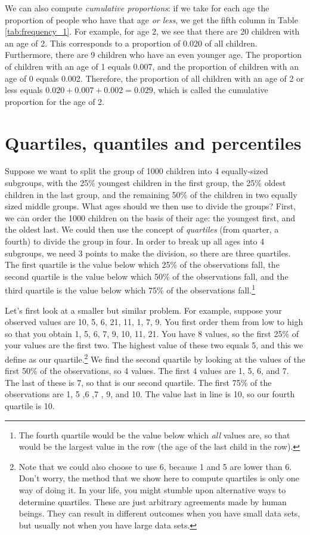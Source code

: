 \documentclass[]{report}\usepackage[]{graphicx}\usepackage[]{color}
\begin{document}
We can also compute \textit{cumulative proportions}: if we take for each age the proportion of people who have that age \textit{or less}, we get the fifth column in Table \ref{tab:frequency_1}. For example, for age 2, we see that there are 20 children with an age of 2. This corresponds to a proportion of 0.020 of all children. Furthermore, there are 9 children who have an even younger age. The proportion of children with an age of 1 equals 0.007, and the proportion of children with an age of 0 equals 0.002. Therefore, the proportion of all children with an age of 2 or less equals $0.020+0.007+0.002=0.029$, which is called the cumulative proportion for the age of 2.



\section{Quartiles, quantiles and percentiles}

Suppose we want to split the group of 1000 children into 4 equally-sized subgroups, with the 25\% youngest children in the first group, the 25\% oldest children in the last group, and the remaining 50\% of the children in two equally sized middle groups. What ages should we then use to divide the groups? First, we can order the 1000 children on the basis of their age: the youngest first, and the oldest last. We could then use the concept of \textit{quartiles} (from quarter, a fourth) to divide the group in four. In order to break up all ages into 4 subgroups, we need 3 points to make the division, so there are three quartiles. The first quartile is the value below which 25\% of the observations fall, the second quartile is the value below which 50\% of the observations fall, and the third quartile is the value below which 75\% of the observations fall.\footnote{The fourth quartile would be the value below which \textit{all} values are, so that would be the largest value in the row (the age of the last child in the row).}

Let's first look at a smaller but similar problem. For example, suppose your observed values are {10, 5, 6, 21, 11, 1, 7, 9}. You first order them from low to high so that you obtain {1, 5, 6, 7, 9, 10, 11, 21}. You have 8 values, so the first 25\% of your values are the first two. The highest value of these two equals 5, and this we define as our quartile.\footnote{Note that we could also choose to use 6,
because 1 and 5 are lower than 6. Don't worry, the method that we show here to compute quartiles is only one way of doing it. In your life, you might stumble upon alternative ways to determine quartiles. These are just arbitrary agreements made by human beings. They can result in different outcomes when you have small data sets, but usually not when you have large data sets.} We find the second quartile by looking at the values of the first 50\% of the observations, so 4 values. The first 4 values are 1, 5, 6, and 7. The last of these is 7, so that is our second quartile. The first 75\% of the observations are 1, 5 ,6 ,7 , 9, and 10. The value last in line is 10, so our fourth quartile is 10.
\end{document}
